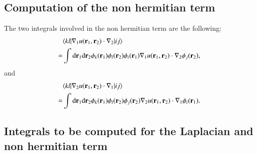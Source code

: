 \documentclass[aip,jcp,reprint,noshowkeys,superscriptaddress]{revtex4-1}
\newcommand{\matelem}[3]{\langle #1 | #2 | #3 \rangle}
\newcommand{\br}[0]{{\bf {r}}}
\newcommand{\bri}[1]{{\bf r}_{#1}}
\begin{document}
\subsection{Computation of the non hermitian term}
The two integrals involved in the non hermitian term are the following: 
\begin{equation}
 \label{eq:nh_1}
 \begin{aligned}
&   \matelem{kl}{ \nabla_1 u(\bri{1},\bri{2}) \cdot \nabla_2 }{ij} \\ 
=& \int \text{d}\br_{1} \text{d}\br_{2} \phi_k(\br_1) \phi_l(\br_2) \phi_i(\br_1) \nabla_1 u(\bri{1},\bri{2}) \cdot \nabla_2 \phi_j(\br_2), 
 \end{aligned}
\end{equation}
and 
\begin{equation}
 \label{eq:nh_2}
 \begin{aligned}
&   \matelem{kl}{ \nabla_2 u(\bri{1},\bri{2}) \cdot \nabla_1 }{ij} \\ 
=& \int \text{d}\br_{1} \text{d}\br_{2} \phi_k(\br_1) \phi_l(\br_2) \phi_j(\br_2) \nabla_2 u(\bri{1},\bri{2}) \cdot \nabla_1 \phi_i(\br_1). 
 \end{aligned}
\end{equation}

\subsection{Integrals to be computed for the Laplacian and non hermitian term}
\end{document}
